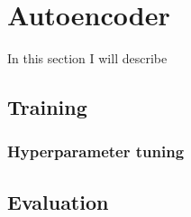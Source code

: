 \section{Autoencoder} \label{sec:autoencoder}
In this section I will describe


\subsection{Training} \label{sec:training}

\subsubsection{Hyperparameter tuning} \label{sec:training-hyperparameter-tuning}


\subsection{Evaluation} \label{sec:evaluation}